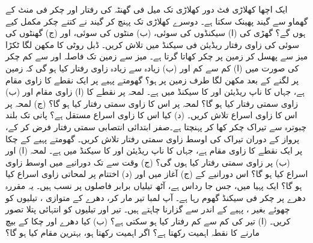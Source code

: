 ایک اچھا کھلاڑی  فٹ دور  کھلاڑی تک   میل فی گھنٹہ کی رفتار   اور  چکر فی منٹ  کے گھماو سے  گیند  پھینک سکتا ہے۔ دوسرے کھلاڑی تک پہنچ کر گیند نے کتنے چکر مکمل کیے ہوں گے؟
گھڑی کی (ا) سیکنڈوں کی سوئی، (ب) منٹوں کی سوئی، اور (ج) گھنٹوں کی سوئی  کی زاوی رفتار  ریڈیئن فی سیکنڈ میں تلاش کریں۔
  ڈبل روٹی  کا  مکھن لگا ٹکڑا میز  سے پھسل کر زمین پر چکر کھاتا  گرتا ہے۔ میز سے زمین تک فاصلہ  اور    سے  کم چکر کی صورت میں (ا) کم سے کم اور (ب) زیادہ سے زیادہ   زاوی رفتار  کیا ہو گی کہ زمین پر  لگنے کے بعد   مکھن    لگا  طرف زمین پر  ہو؟
گھومتے پہیے پر ایک نقطے کا زاوی مقام  ہے، جہاں  کا  ناپ ریڈیئن اور   کا  سیکنڈ میں ہے۔ لمحہ  پر  نقطے کا (ا)  زاوی مقام   اور  (ب) زاوی سمتی رفتار  کیا ہو گا؟ لمحہ  پر  اس کا زاوی سمتی رفتار کیا ہو گا؟ (ج) لمحہ  پر اس کا زاوی اسراع تلاش کریں۔ (د) کیا اس کا زاوی اسراع مستقل ہے؟
 پانی تک  بلند چبوترہ سے  تیراک  چکر کھا  کر  پہنچتا ہے۔صفر ابتدائی انتصابی سمتی رفتار فرض کر کے،   پرواز کے دوران  تیراک کی اوسط زاوی سمتی رفتار تلاش کریں۔
گھومتے پہیے کے چکا  پر  ایک نقطے کا زاوی مقام  ہے، جہاں  کا ناپ ریڈیئن اور   کا سیکنڈ میں ہے۔  لمحہ  (ا)  اور (ب)     پر  زاوی سمتی رفتار کیا ہوں گی؟  (ج)  وقت   سے   تک دورانیے میں  اوسط زاوی اسراع کیا ہو گا؟ اس دورانیے کے (ج) آغاز میں اور (د) اختتام پر لمحاتی زاوی اسراع کیا ہو گا؟
ایک پہیا میں،  جس جا رداس  ہے،   آٹھ  تیلیاں  برابر فاصلوں پر نسب ہیں۔ یہ مقررہ دھرے پر  چکر فی سیکنڈ گھوم رہا ہے۔ آپ  لمبا تیر   مار کر، دھرے  کے متوازی  ، تیلیوں کو چھوئے بغیر ،  پہیے کے اندر  سے  گزارنا چاہتے ہیں۔ تیر اور تیلیوں کو انتہائی پتلا تصور کریں۔ (ا) تیر کی کم سے کم رفتار کیا ہو سکتی ہے؟ (ب) کیا دھرے اور چکا کے بیچ  مارنے کا نقطہ اہمیت رکھتا ہے؟ اگر اہمیت رکھتا ہو، بہترین مقام کیا ہو گا؟
